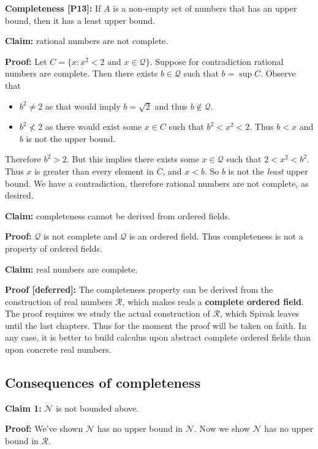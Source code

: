 \vs

\textbf{Completeness [P13]:} If $A$ is a non-empty set of numbers that
has an upper bound, then it has a least upper bound.

\vs

\textbf{Claim:} rational numbers are not complete.

\textbf{Proof:} Let $C=\{x:x^{2}<2\text{ and }x\in\mathcal{Q}\}$. Suppose for
contradiction rational numbers are complete. Then there exists
$b\in\mathcal{Q}$ such that $b=\sup C$. Observe that
\begin{itemize}
\item $b^{2}\neq2$ as that would imply $b=\sqrt{2}$ and thus $b\notin\mathcal{Q}$.
\item $b^{2}\not<2$ as there would exist some $x\in C$ such that
  $b^{2}<x^{2}<2$. Thus $b<x$ and $b$ is not the upper bound.
\end{itemize}

Therefore $b^{2}>2$. But this implies there exists some
$x\in\mathcal{Q}$ such that $2<x^{2}<b^{2}$. Thus $x$ is greater than every
element in $C$, and $x<b$. So $b$ is not the \textit{least} upper
bound. We have a contradiction, therefore rational numbers are not
complete, as desired.

\vs

\textbf{Claim:} completeness cannot be derived from ordered fields.

\textbf{Proof:} $\mathcal{Q}$ is not complete and $\mathcal{Q}$ is an ordered field. Thus
completeness is not a property of ordered fields.

\vs

\textbf{Claim:} real numbers are complete.

\textbf{Proof [deferred]:} The completeness property can be derived
from the construction of real numbers $\mathcal{R}$, which makes reals a
\textbf{complete ordered field}. The proof requires we study the
actual construction of $\mathcal{R}$, which Spivak leaves until the last
chapters. Thus for the moment the proof will be taken on faith. In any
case, it is better to build calculus upon abstract complete ordered
fields than upon concrete real numbers.

\subsection{Consequences of completeness}
\textbf{Claim 1:} $\mathcal{N}$ is not bounded above.

\textbf{Proof:} We've shown $\mathcal{N}$ has no upper bound in $\mathcal{N}$. Now we
show $\mathcal{N}$ has no upper bound in $\mathcal{R}$.

